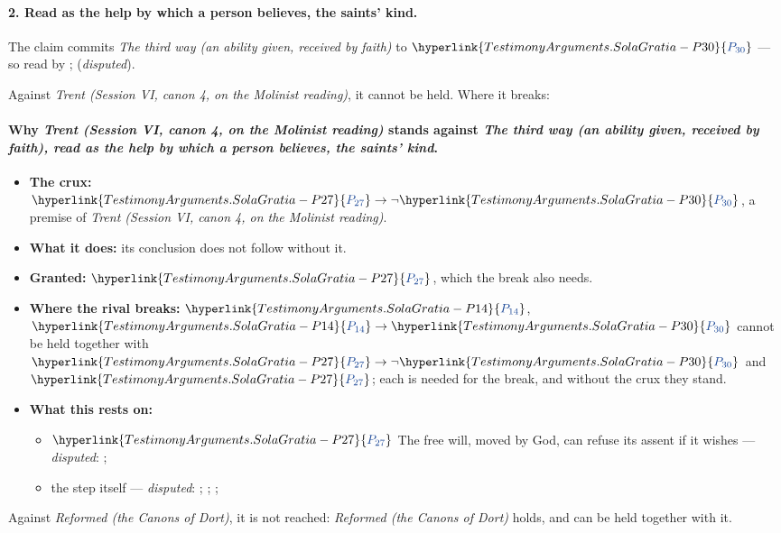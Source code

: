 \documentclass[11pt]{article}
\newcommand{\pvar}[2]{\hyperlink{#1-P#2}{\textcolor{claimlink}{P_{#2}}}}
\begin{document}
\paragraph{2. Read as the help by which a person believes, the saints’ kind.} The claim commits \emph{The third way (an ability given, received by faith)} to \(\pvar{TestimonyArguments.SolaGratia}{30}\) --- so read by \cite[485]{npnf1-05-1887}; \cite[591]{schaff-creeds-christendom-3-1977} (\emph{disputed}).

Against \emph{Trent (Session VI, canon 4, on the Molinist reading)}, it cannot be held. Where it breaks:
\paragraph{Why \emph{Trent (Session VI, canon 4, on the Molinist reading)} stands against \emph{The third way (an ability given, received by faith), read as the help by which a person believes, the saints’ kind}.}
\begin{itemize}
\item \textbf{The crux:} \(\pvar{TestimonyArguments.SolaGratia}{27} \rightarrow \lnot \pvar{TestimonyArguments.SolaGratia}{30}\), a premise of \emph{Trent (Session VI, canon 4, on the Molinist reading)}.
\item \textbf{What it does:} its conclusion does not follow without it.
\item \textbf{Granted:} \(\pvar{TestimonyArguments.SolaGratia}{27}\), which the break also needs.
\item \textbf{Where the rival breaks:} \(\pvar{TestimonyArguments.SolaGratia}{14}\), \(\pvar{TestimonyArguments.SolaGratia}{14} \rightarrow \pvar{TestimonyArguments.SolaGratia}{30}\) cannot be held together with \(\pvar{TestimonyArguments.SolaGratia}{27} \rightarrow \lnot \pvar{TestimonyArguments.SolaGratia}{30}\) and \(\pvar{TestimonyArguments.SolaGratia}{27}\); each is needed for the break, and without the crux they stand.
\item \textbf{What this rests on:}
\begin{itemize}
\item \(\pvar{TestimonyArguments.SolaGratia}{27}\) The free will, moved by God, can refuse its assent if it wishes --- \emph{disputed}: \cite[Trent, Session VI (1547), canon 4]{tanner-decrees-1990}; \cite[45]{waterworth-trent-1848}
\item the step itself --- \emph{disputed}: \cite[I-II q.10 a.4 ad 3]{aquinas-summa-1920}; \cite[I-II q.112 a.3]{aquinas-summa-1920}; \cite[Trent, Session VI (1547), canon 4]{tanner-decrees-1990}; \cite[45]{waterworth-trent-1848}
\end{itemize}
\end{itemize}
Against \emph{Reformed (the Canons of Dort)}, it is not reached: \emph{Reformed (the Canons of Dort)} holds, and can be held together with it.
\end{document}
